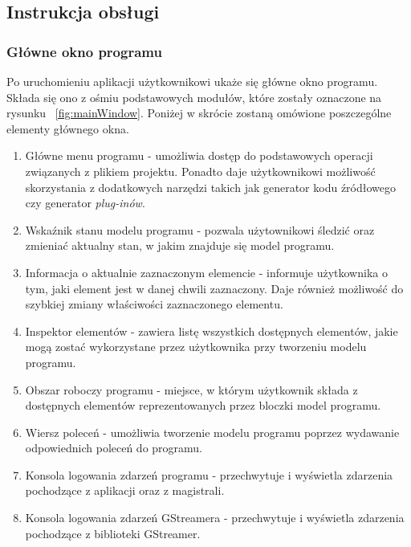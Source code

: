 \documentclass[12pt]{article}
\begin{document}
\subsection{Instrukcja obsługi}
\subsubsection{Główne okno programu}
Po uruchomieniu aplikacji użytkownikowi ukaże się główne okno programu. Składa się ono z ośmiu podstawowych modułów, które zostały oznaczone na rysunku ~\ref{fig:mainWindow}. Poniżej w skrócie zostaną omówione poszczególne elementy głównego okna.
\begin{enumerate}
  \setlength{\itemsep}{0em}
\item Główne menu programu - umożliwia dostęp do podstawowych operacji związanych z plikiem projektu. Ponadto daje użytkownikowi możliwość skorzystania z dodatkowych narzędzi takich jak generator kodu źródłowego czy generator \textit{plug-inów}.
\item Wskaźnik stanu modelu programu - pozwala użytownikowi śledzić oraz zmieniać aktualny stan, w jakim znajduje się model programu.
\item Informacja o aktualnie zaznaczonym elemencie - informuje użytkownika o tym, jaki element jest w danej chwili zaznaczony. Daje również możliwość do szybkiej zmiany właściwości zaznaczonego elementu.
\item Inspektor elementów - zawiera listę wszystkich dostępnych elementów, jakie mogą zostać wykorzystane przez użytkownika przy tworzeniu modelu programu.
\item Obszar roboczy programu - miejsce, w którym użytkownik składa z dostępnych elementów reprezentowanych przez bloczki model programu.
\item Wiersz poleceń - umożliwia tworzenie modelu programu poprzez wydawanie odpowiednich poleceń do programu.
\item Konsola logowania zdarzeń programu - przechwytuje i wyświetla zdarzenia pochodzące z aplikacji oraz z magistrali.
\item Konsola logowania zdarzeń GStreamera - przechwytuje i wyświetla zdarzenia pochodzące z biblioteki GStreamer.
\end{enumerate}
\end{document}
